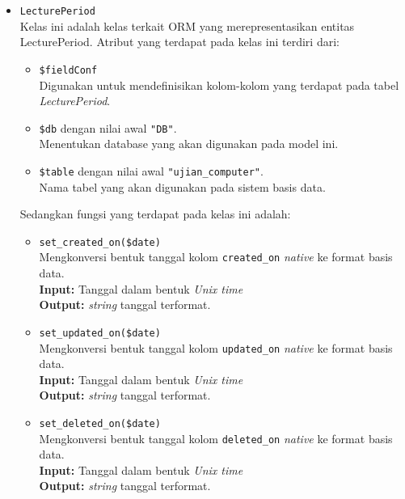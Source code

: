 \begin{itemize}
        \item \texttt{LecturePeriod} \\
            Kelas ini adalah kelas terkait ORM yang merepresentasikan entitas LecturePeriod. Atribut yang 
            terdapat pada kelas ini terdiri dari:
            \begin{itemize}
                \item \texttt{\$fieldConf} \\
                    Digunakan untuk mendefinisikan kolom-kolom yang terdapat pada tabel \textit{LecturePeriod}.
                \item \texttt{\$db} dengan nilai awal \texttt{"DB"}. \\
                    Menentukan database yang akan digunakan pada model ini.
                \item \texttt{\$table} dengan nilai awal \texttt{"ujian\_computer"}. \\
                    Nama tabel yang akan digunakan pada sistem basis data. 
            \end{itemize}
            Sedangkan fungsi yang terdapat pada kelas ini adalah:
            \begin{itemize}
                \item \texttt{set\_created\_on(\$date)} \\
                    Mengkonversi bentuk tanggal kolom \texttt{created\_on} \textit{native} ke 
                    format basis data. \\
                    \textbf{Input:} Tanggal dalam bentuk \textit{Unix time}\\
                    \textbf{Output:} \textit{string} tanggal terformat.
                
                \item \texttt{set\_updated\_on(\$date)} \\
                    Mengkonversi bentuk tanggal kolom \texttt{updated\_on} \textit{native} ke 
                    format basis data. \\
                    \textbf{Input:} Tanggal dalam bentuk \textit{Unix time}\\
                    \textbf{Output:} \textit{string} tanggal terformat.
                    
                \item \texttt{set\_deleted\_on(\$date)} \\
                    Mengkonversi bentuk tanggal kolom \texttt{deleted\_on} \textit{native} ke 
                    format basis data. \\
                    \textbf{Input:} Tanggal dalam bentuk \textit{Unix time}\\
                    \textbf{Output:} \textit{string} tanggal terformat.
                    

\end{itemize}
\end{itemize}
